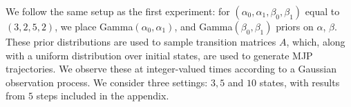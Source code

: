 


We follow the same setup as the first experiment:
for $(\alpha_0,\alpha_1,\beta_0,\beta_1)$ equal to $(3,2,5,2)$,
we place Gamma$(\alpha_0,\alpha_1)$, and Gamma$(\beta_0, \beta_1)$ priors on 
$\alpha$, $\beta$. These prior distributions are used to sample transition 
matrices $A$, which, along with a uniform distribution over initial states,
are used to generate MJP trajectories. We observe these at integer-valued
times according to a Gaussian observation process.
We consider three settings: $3, 5$ and $10$ states, with results from $5$ 
steps included in the appendix. 

